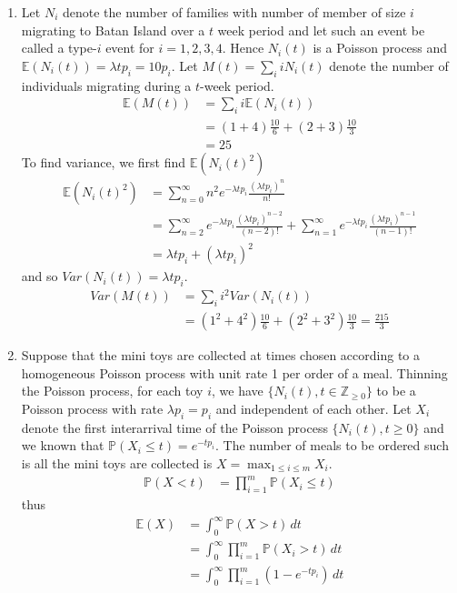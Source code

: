 \documentclass[a4paper,10pt]{article}
\theoremstyle{definition}
\begin{document}
\begin{enumerate}
\item Let $N_i$ denote the number of families with number of member of size $i$ migrating to Batan Island over a $t$ week period and let such an event be called a type-$i$ event for $i=1,2,3,4$. Hence $N_i(t)$ is a Poisson process and $\mathbb{E}(N_i(t))=\lambda t p_i=10p_i$. Let $M(t)=\sum_{i}iN_i(t)$ denote the number of individuals migrating during a $t$-week period. 
\begin{align*}
\mathbb{E}(M(t))&=\sum_{i}i\mathbb{E}(N_i(t))\\
&=(1+4)\frac{10}{6}+(2+3)\frac{10}{3}\\
&=25
\end{align*}
To find variance, we first find $\mathbb{E}(N_i(t)^2)$
\begin{align*}
\mathbb{E}(N_i(t)^2)&=\sum_{n=0}^{\infty}n^2e^{-\lambda t p_i}\frac{(\lambda t p_i)^n}{n!}\\
&=\sum_{n=2}^{\infty}e^{-\lambda t p_i}\frac{(\lambda t p_i)^{n-2}}{(n-2)!}+\sum_{n=1}^{\infty}e^{-\lambda t p_i}\frac{(\lambda t p_i)^{n-1}}{(n-1)!}\\
&=\lambda t p_i+(\lambda t p_i)^2
\end{align*}
and so $Var(N_i(t))=\lambda t p_i$.
\begin{align*}
Var(M(t))&=\sum_{i}i^2Var(N_i(t))\\
&=(1^2+4^2)\frac{10}{6}+(2^2+3^2)\frac{10}{3}=\frac{215}{3}
\end{align*}

\item 
Suppose that the mini toys are collected at times chosen according to a homogeneous Poisson process with unit rate 1 per order of a meal. Thinning the Poisson process, for each toy $i$, we have $\{N_i(t),t \in \mathbb{Z}_{\geq0}\}$ to be a Poisson process with rate $\lambda p_i=p_i$ and independent of each other. Let $X_i$ denote the first interarrival time of the Poisson process $\{N_i(t),t\geq 0\}$ and we known that $\mathbb{P}(X_i\leq t)=e^{-tp_i}$. The number of meals to be ordered such is all the mini toys are collected is $X = \max_{1\leq i\leq m} X_i$.
\begin{align*}
\mathbb{P}(X<t) &= \prod_{i=1}^{m}\mathbb{P}(X_i\leq t)
\end{align*}
thus
\begin{align*}
\mathbb{E}(X)&=\int_{0}^{\infty}\mathbb{P}(X> t)\,dt\\
&=\int_{0}^{\infty} \prod_{i=1}^{m}\mathbb{P}(X_i> t)\,dt\\
&=\int_{0}^{\infty} \prod_{i=1}^{m}(1-e^{-tp_i})\,dt
\end{align*}


\end{enumerate}
\end{document}
